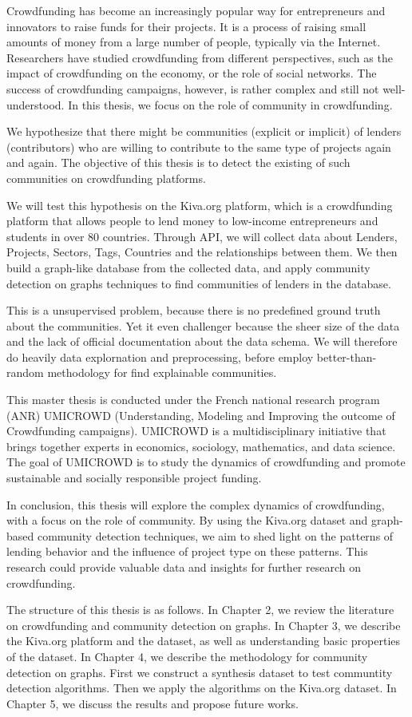 Crowdfunding has become an increasingly popular way for entrepreneurs and innovators to raise funds for their projects.
It is a process of raising small amounts of money from a large number of people, typically via the Internet.
Researchers have studied crowdfunding from different perspectives, such as the impact of crowdfunding on the economy, or the role of social networks.
The success of crowdfunding campaigns, however, is rather complex and still not well-understood.
In this thesis, we focus on the role of community in crowdfunding.

We hypothesize that there might be communities (explicit or implicit) of lenders (contributors) who are willing to contribute to the same type of projects again and again.
The objective of this thesis is to detect the existing of such communities on crowdfunding platforms.

We will test this hypothesis on the Kiva.org platform,
which is a crowdfunding platform that allows people to lend money to low-income entrepreneurs and students in over 80 countries.
Through API, we will collect data about Lenders, Projects, Sectors, Tags, Countries and the relationships between them.
We then build a graph-like database from the collected data,
and apply community detection on graphs techniques to find communities of lenders in the database.

This is a unsupervised problem, because there is no predefined ground truth about the communities.
Yet it even challenger because the sheer size of the data and the lack of official documentation about the data schema.
We will therefore do heavily data explornation and preprocessing,
before employ better-than-random methodology for find explainable communities.

This master thesis is conducted under the French national research program (ANR) UMICROWD (Understanding, Modeling and Improving the outcome of Crowdfunding campaigns).
UMICROWD is a multidisciplinary initiative that brings together experts in economics, sociology, mathematics, and data science.
The goal of UMICROWD is to study the dynamics of crowdfunding and promote sustainable and socially responsible project funding.

In conclusion, this thesis will explore the complex dynamics of crowdfunding, with a focus on the role of community.
By using the Kiva.org dataset and graph-based community detection techniques,
we aim to shed light on the patterns of lending behavior and the influence of project type on these patterns.
This research could provide valuable data and insights for further research on crowdfunding.

The structure of this thesis is as follows.
In Chapter 2, we review the literature on crowdfunding and community detection on graphs.
In Chapter 3, we describe the Kiva.org platform and the dataset,
as well as understanding basic properties of the dataset.
In Chapter 4, we describe the methodology for community detection on graphs.
First we construct a synthesis dataset to test communtity detection algorithms.
Then we apply the algorithms on the Kiva.org dataset.
In Chapter 5, we discuss the results and propose future works.

